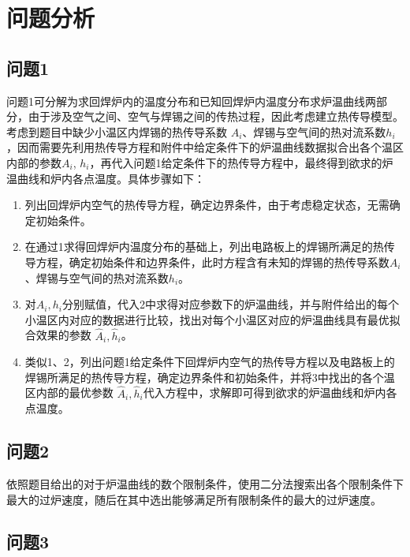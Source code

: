 \documentclass[../main.tex]{subfiles}
\begin{document}
\section{问题分析}


\subsection{问题1}
问题1可分解为求回焊炉内的温度分布和已知回焊炉内温度分布求炉温曲线两部分，由于涉及空气之间、空气与焊锡之间的传热过程，因此考虑建立热传导模型。考虑到题目中缺少小温区内焊锡的热传导系数 \(A_i\)、焊锡与空气间的热对流系数\(h_i\)，因而需要先利用热传导方程和附件中给定条件下的炉温曲线数据拟合出各个温区内部的参数\(A_{i}\), \(h_{i}\)，再代入问题1给定条件下的热传导方程中，最终得到欲求的炉温曲线和炉内各点温度。具体步骤如下：
\begin{enumerate}
\item 列出回焊炉内空气的热传导方程，确定边界条件，由于考虑稳定状态，无需确定初始条件。
\item 在通过1求得回焊炉内温度分布的基础上，列出电路板上的焊锡所满足的热传导方程，确定初始条件和边界条件，此时方程含有未知的焊锡的热传导系数\(A_{i}\)、焊锡与空气间的热对流系数\(h_{i}\)。
\item 对\(A_{i}, h_{i}\)分别赋值，代入2中求得对应参数下的炉温曲线，并与附件给出的每个小温区内对应的数据进行比较，找出对每个小温区对应的炉温曲线具有最优拟合效果的参数 \(\hat A _{i} , \hat h_{i}\)。
\item 类似1、2，列出问题1给定条件下回焊炉内空气的热传导方程以及电路板上的焊锡所满足的热传导方程，确定边界条件和初始条件，并将3中找出的各个温区内部的最优参数 \(\hat A _{i} , \hat h _{i}\)代入方程中，求解即可得到欲求的炉温曲线和炉内各点温度。
\end{enumerate}

\subsection{问题2}
依照题目给出的对于炉温曲线的数个限制条件，使用二分法搜索出各个限制条件下最大的过炉速度，随后在其中选出能够满足所有限制条件的最大的过炉速度。
\subsection{问题3}
\end{document}
